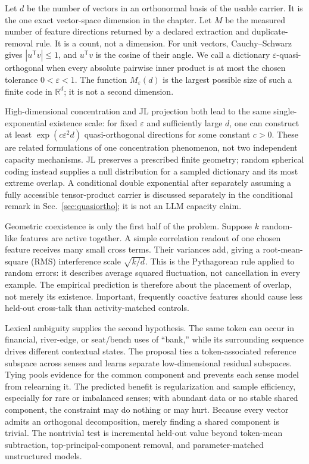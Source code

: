 \documentclass[
  aps,
  reprint,
  superscriptaddress,
  floatfix,
  nofootinbib,
  longbibliography
]{revtex4-2}
\newcommand{\R}{\mathbb{R}}
\newcommand{\Msem}{M}
\newcommand{\T}{^{\mathsf{T}}}
\begin{document}
Let $d$ be the number of vectors in an orthonormal basis of the usable carrier.
It is the one exact vector-space dimension in the chapter.  Let $\Msem$ be the
measured number of feature directions returned by a declared extraction and
duplicate-removal rule.  It is a count, not a dimension.  For unit vectors,
Cauchy--Schwarz gives $|u\T v|\leq1$, and $u\T v$ is the cosine of their angle.
We call a dictionary $\varepsilon$-quasi-orthogonal when every absolute
pairwise inner product is at most the chosen tolerance
$0<\varepsilon<1$.  The function $M_\varepsilon(d)$ is the largest possible
size of such a finite code in $\R^d$; it is not a second dimension.

High-dimensional concentration and JL projection both lead to the same
single-exponential existence scale: for fixed $\varepsilon$ and sufficiently
large $d$, one can construct at least
$\exp(c\varepsilon^2d)$ quasi-orthogonal directions for some constant $c>0$.
These are related formulations of one concentration phenomenon, not two
independent capacity mechanisms.  JL preserves a prescribed finite geometry;
random spherical coding instead supplies a null distribution for a sampled
dictionary and its most extreme overlap.  A conditional double exponential
after separately assuming a fully accessible tensor-product carrier is
discussed separately in the conditional remark in
Sec.~\ref{sec:quasiortho}; it is not an LLM capacity
claim.

Geometric coexistence is only the first half of the problem.  Suppose $k$
random-like features are active together.  A simple correlation readout of one
chosen feature receives many small cross terms.  Their variances add, giving a
root-mean-square (RMS) interference scale $\sqrt{k/d}$.  This is the
Pythagorean rule applied to random errors: it describes average squared
fluctuation, not cancellation in every example.  The empirical prediction is
therefore about the placement of overlap, not merely its existence.  Important,
frequently coactive features should cause less held-out cross-talk than
activity-matched controls.

Lexical ambiguity supplies the second hypothesis.  The same token can occur in
financial, river-edge, or seat/bench uses of ``bank,'' while its surrounding
sequence drives different contextual states.  The proposal ties a
token-associated reference subspace across senses and learns separate
low-dimensional residual subspaces.  Tying pools evidence for the common
component and prevents each sense model from relearning it.  The predicted
benefit is regularization and sample efficiency, especially for rare or
imbalanced senses; with abundant data or no stable shared component, the
constraint may do nothing or may hurt.  Because every vector admits an
orthogonal decomposition, merely finding a shared component is trivial.  The
nontrivial test is incremental held-out value beyond token-mean subtraction,
top-principal-component removal, and parameter-matched unstructured models.
\end{document}
